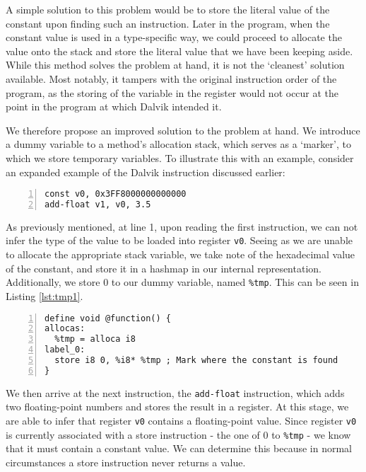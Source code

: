 A simple solution to this problem would be to store the literal value of the constant upon finding such an instruction. Later in the program, when the constant value is used in a type-specific way, we could proceed to allocate the value onto the stack and store the literal value that we have been keeping aside. While this method solves the problem at hand, it is not the `cleanest' solution available. Most notably, it tampers with the original instruction order of the program, as the storing of the variable in the register would not occur at the point in the program at which Dalvik intended it.

We therefore propose an improved solution to the problem at hand. We introduce a dummy variable to a method's allocation stack, which serves as a `marker', to which we store temporary variables. To illustrate this with an example, consider an expanded example of the Dalvik instruction discussed earlier:

\begin{lstlisting}[frame=single, numbers=left, numberstyle=\tiny]
const v0, 0x3FF8000000000000
add-float v1, v0, 3.5
\end{lstlisting}

As previously mentioned, at line 1, upon reading the first instruction, we can not infer the type of the value to be loaded into register \verb|v0|. Seeing as we are unable to allocate the appropriate stack variable, we take note of the hexadecimal value of the constant, and store it in a hashmap in our internal representation. Additionally, we store 0 to our dummy variable, named \verb|%tmp|. This can be seen in Listing \ref{lst:tmp1}.


\begin{lstlisting}[frame=single, numbers=left, numberstyle=\tiny, caption={LLVM bytecode handling type inference}, label=lst:tmp1]
define void @function() {
allocas:
  %tmp = alloca i8
label_0:
  store i8 0, %i8* %tmp ; Mark where the constant is found
}
\end{lstlisting}

We then arrive at the next instruction, the \verb|add-float| instruction, which adds two floating-point numbers and stores the result in a register. At this stage, we are able to infer that register \verb|v0| contains a floating-point value. Since register \verb|v0| is currently associated with a store instruction - the one of 0 to \verb|%tmp| - we know that it must contain a constant value. We can determine this because in normal circumstances a store instruction never returns a value.


